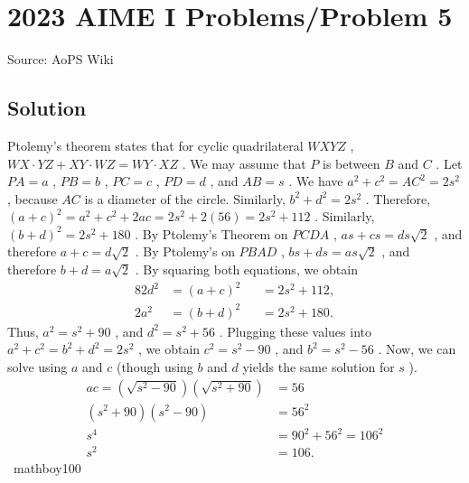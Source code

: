 \documentclass[12pt]{article}
\begin{document}
\section*{{2023 AIME I Problems/Problem 5}}
Source: AoPS Wiki

\subsection*{Solution}
Ptolemy's theorem states that for cyclic quadrilateral $WXYZ$ , $WX\cdot YZ + XY\cdot WZ = WY\cdot XZ$ . We may assume that $P$ is between $B$ and $C$ . Let $PA = a$ , $PB = b$ , $PC = c$ , $PD = d$ , and $AB = s$ . We have $a^2 + c^2 = AC^2 = 2s^2$ , because $AC$ is a diameter of the circle. Similarly, $b^2 + d^2 = 2s^2$ . Therefore, $(a+c)^2 = a^2 + c^2 + 2ac = 2s^2 + 2(56) = 2s^2 + 112$ . Similarly, $(b+d)^2 = 2s^2 + 180$ . By Ptolemy's Theorem on $PCDA$ , $as + cs = ds\sqrt{2}$ , and therefore $a + c = d\sqrt{2}$ . By Ptolemy's on $PBAD$ , $bs + ds = as\sqrt{2}$ , and therefore $b + d = a\sqrt{2}$ . By squaring both equations, we obtain \begin{alignat*}{8} 2d^2 &= (a+c)^2 &&= 2s^2 + 112, \\ 2a^2 &= (b+d)^2 &&= 2s^2 + 180. \end{alignat*} Thus, $a^2 = s^2 + 90$ , and $d^2 = s^2 + 56$ . Plugging these values into $a^2 + c^2 = b^2 + d^2 = 2s^2$ , we obtain $c^2 = s^2 - 90$ , and $b^2 = s^2 - 56$ . Now, we can solve using $a$ and $c$ (though using $b$ and $d$ yields the same solution for $s$ ). \begin{align*} ac = (\sqrt{s^2 - 90})(\sqrt{s^2 + 90}) &= 56 \\ (s^2 + 90)(s^2 - 90) &= 56^2 \\ s^4 &= 90^2 + 56^2 = 106^2 \\ s^2 &= \boxed{106}. \end{align*} ~mathboy100
\end{document}
